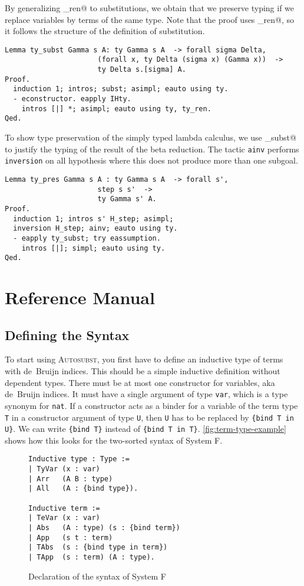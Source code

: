 \documentclass{scrartcl}
\newcommand{\Autosubst}{\textsc{Autosubst}\xspace}
\newcommand{\lst}{\lstinline}
\begin{document}
By generalizing \lst@ty_ren@ to substitutions, we obtain that we preserve typing if we replace variables by terms of the same type. Note that the proof uses \lst@ty_ren@, so it follows the structure of the definition of substitution.
\begin{lstlisting}
Lemma ty_subst Gamma s A: ty Gamma s A  -> forall sigma Delta,
                      (forall x, ty Delta (sigma x) (Gamma x))  ->
                      ty Delta s.[sigma] A.
Proof.
  induction 1; intros; subst; asimpl; eauto using ty. 
  - econstructor. eapply IHty.
    intros [|] *; asimpl; eauto using ty, ty_ren.
Qed.
\end{lstlisting}

To show type preservation of the simply typed lambda calculus, we use \lst@ty_subst@ to justify the typing of the result of the beta reduction.
The tactic \lst$ainv$ performs \lst$inversion$ on all hypothesis where this does not produce more than one subgoal.
\begin{lstlisting}
Lemma ty_pres Gamma s A : ty Gamma s A  -> forall s', 
                      step s s'  -> 
                      ty Gamma s' A.
Proof.
  induction 1; intros s' H_step; asimpl;
  inversion H_step; ainv; eauto using ty.
  - eapply ty_subst; try eassumption.
    intros [|]; simpl; eauto using ty.
Qed.      
\end{lstlisting}

\section{Reference Manual}
\label{sec:manual}

\subsection{Defining the Syntax}
\label{sec:defining-syntax}

To start using \Autosubst, you first have to define an inductive type of terms with de~Bruijn indices.
This should be a simple inductive definition without dependent types.
There must be at most one constructor for variables, aka de~Bruijn indices. It must have a single argument of type \lst$var$, which is a type synonym for \lst$nat$.
If a constructor acts as a binder for a variable of the term type \lst$T$ in a constructor argument of type \lst$U$, then \lst$U$ has to be replaced by \lst${bind T in U}$.
We can write \lst${bind T}$ instead of \lst${bind T in T}$.
\autoref{fig:term-type-example} shows how this looks for the two-sorted syntax of System F. 
\begin{figure}
  \centering
  \begin{lstlisting}
Inductive type : Type :=
| TyVar (x : var)
| Arr   (A B : type)
| All   (A : {bind type}).

Inductive term :=
| TeVar (x : var)
| Abs   (A : type) (s : {bind term})
| App   (s t : term)
| TAbs  (s : {bind type in term})
| TApp  (s : term) (A : type).
\end{lstlisting}
  \caption{Declaration of the syntax of System F}
  \label{fig:term-type-example}
\end{figure}
\end{document}
